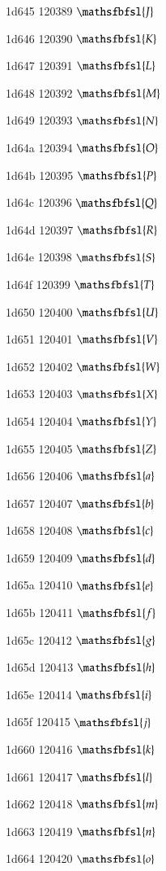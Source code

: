 \documentclass[11pt]{article}
\begin{document}
1d645 120389 \ensuremath{\mathsfbfsl{J}}

1d646 120390 \ensuremath{\mathsfbfsl{K}}

1d647 120391 \ensuremath{\mathsfbfsl{L}}

1d648 120392 \ensuremath{\mathsfbfsl{M}}

1d649 120393 \ensuremath{\mathsfbfsl{N}}

1d64a 120394 \ensuremath{\mathsfbfsl{O}}

1d64b 120395 \ensuremath{\mathsfbfsl{P}}

1d64c 120396 \ensuremath{\mathsfbfsl{Q}}

1d64d 120397 \ensuremath{\mathsfbfsl{R}}

1d64e 120398 \ensuremath{\mathsfbfsl{S}}

1d64f 120399 \ensuremath{\mathsfbfsl{T}}

1d650 120400 \ensuremath{\mathsfbfsl{U}}

1d651 120401 \ensuremath{\mathsfbfsl{V}}

1d652 120402 \ensuremath{\mathsfbfsl{W}}

1d653 120403 \ensuremath{\mathsfbfsl{X}}

1d654 120404 \ensuremath{\mathsfbfsl{Y}}

1d655 120405 \ensuremath{\mathsfbfsl{Z}}

1d656 120406 \ensuremath{\mathsfbfsl{a}}

1d657 120407 \ensuremath{\mathsfbfsl{b}}

1d658 120408 \ensuremath{\mathsfbfsl{c}}

1d659 120409 \ensuremath{\mathsfbfsl{d}}

1d65a 120410 \ensuremath{\mathsfbfsl{e}}

1d65b 120411 \ensuremath{\mathsfbfsl{f}}

1d65c 120412 \ensuremath{\mathsfbfsl{g}}

1d65d 120413 \ensuremath{\mathsfbfsl{h}}

1d65e 120414 \ensuremath{\mathsfbfsl{i}}

1d65f 120415 \ensuremath{\mathsfbfsl{j}}

1d660 120416 \ensuremath{\mathsfbfsl{k}}

1d661 120417 \ensuremath{\mathsfbfsl{l}}

1d662 120418 \ensuremath{\mathsfbfsl{m}}

1d663 120419 \ensuremath{\mathsfbfsl{n}}

1d664 120420 \ensuremath{\mathsfbfsl{o}}
\end{document}
